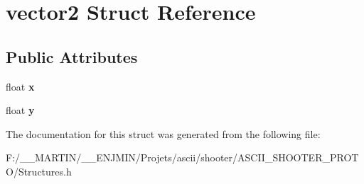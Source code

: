 \hypertarget{structvector2}{}\section{vector2 Struct Reference}
\label{structvector2}
\subsection*{Public Attributes}
\begin{DoxyCompactItemize}
\item 
\hypertarget{structvector2_a76d1e0abcde35596481a7f9e1f30880c}{}\label{structvector2_a76d1e0abcde35596481a7f9e1f30880c} 
float {\bfseries x}
\item 
\hypertarget{structvector2_acc316e5d28b03846f92b1757c38ae35c}{}\label{structvector2_acc316e5d28b03846f92b1757c38ae35c} 
float {\bfseries y}
\end{DoxyCompactItemize}


The documentation for this struct was generated from the following file\+:\begin{DoxyCompactItemize}
\item 
F\+:/\+\_\+\+\_\+\+M\+A\+R\+T\+I\+N/\+\_\+\+\_\+\+E\+N\+J\+M\+I\+N/\+Projets/ascii/shooter/\+A\+S\+C\+I\+I\+\_\+\+S\+H\+O\+O\+T\+E\+R\+\_\+\+P\+R\+O\+T\+O/Structures.\+h\end{DoxyCompactItemize}
